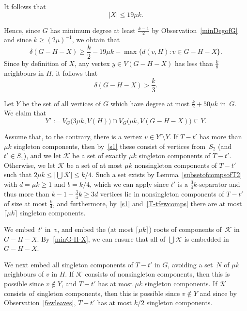 \documentclass[12pt]{article}
\begin{document}
It follows that
\begin{equation}\label{HighX}
|X|\le 19\mu k.
\end{equation}

Hence, since $G$ has minimum degree at least $\frac{k-1}2$ by Observation~\ref{minDegofG} and since $k\ge (2\mu)^{-1}$, we obtain that
\begin{equation}\label{minG-H-X-new}
\delta(G-H-X)\ge \frac{k}2-19\mu k- \max\{d(v,H):v\in G-H-X\}.
\end{equation}
Since by definition of $X$, any vertex $y\in V(G-H- X)$ has less than $\frac k8$ neighbours in $H$, it follows that
\begin{equation}\label{minG-H-X}
\delta(G-H-X)>\frac{k}{3}.
\end{equation}

Let $Y$ be the set of all vertices of $G$ which have degree at most $\frac{k}{2}+50\mu k$ in~$G$. 
We claim that  
\begin{equation}\label{Low}
Y':=V_G\big (3\mu k, V(H)\big )\cap V_G\big (\mu k, V(G-H-X)\big )\subseteq Y.
\end{equation}

Assume that, to the contrary, there is a vertex $v\in Y'\setminus Y$. If $T-t'$ has more than $\mu k$ singleton components, then by~\eqref{s1} these consist of vertices from~$S_2$ (and $t'\in S_1$), and we let $\mathcal K$ be a set of exactly $\mu k$ singleton  components of $T-t'$.
Otherwise,  we let 
 $\mathcal K$ be  a set of at most $\mu k$ nonsingleton components of $T-t'$ such that $2\mu k\le |\bigcup\mathcal K|\le k/4$. 
 Such a set exists 
by  Lemma~\ref{subsetofcompsofT2} with $d=\mu k\ge 1$ and $b=k/4$, which we can apply  since $t'$ is a $\frac 34k$-separator and thus more than $k-1-\frac 34k\ge 3d$ vertices lie in nonsingleton components of $T-t'$ of size at most $\frac k4$, and furthermore, by~\eqref{s1} and~\eqref{T-tfewcomps} there are at most $\lceil\mu k \rceil$ singleton components.

We  embed~$t'$  in~$v$, and embed the  (at most $\lceil\mu k\rceil$)  roots of components  of~$\mathcal K$  in $G-H-X$. 
By~\eqref{minG-H-X}, we can ensure that all of $\bigcup\mathcal K$ is embedded in $G-H-X$. 


We next embed all singleton components of $T-t'$ in $G$, avoiding a set~$N$ of $\mu k$ neighbours of $v$ in $H$. If $\mathcal K$ consists of nonsingleton components, then  this  is possible   since $v\notin Y$, and $T-t'$ has at most $\mu k$ singleton components. If $\mathcal K$ consists of singleton components, then this is possible  since $v\notin Y$ and since by Observation~\ref{fewleaves}, $T-t'$ has at most $k/2$ singleton components. 
\end{document}
